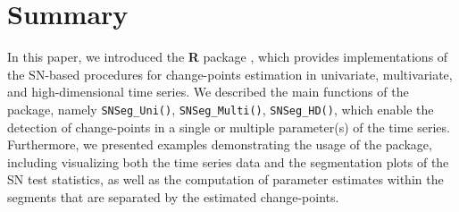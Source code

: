 



\section{Summary}\label{sec:conclusion}
In this paper, we introduced the  \textbf{R} package , which provides implementations of the SN-based procedures for change-points estimation in univariate, multivariate, and high-dimensional time series. We described the main functions of the package, namely \texttt{SNSeg\_Uni()}, \texttt{SNSeg\_Multi()}, \texttt{SNSeg\_HD()}, which enable the detection of change-points in a single or multiple parameter(s) of the time series. Furthermore, we presented examples demonstrating the usage of the package, including visualizing both the time series data and the segmentation plots of the SN test statistics, {as well as the computation of parameter estimates within the segments that are separated by the estimated change-points}.

